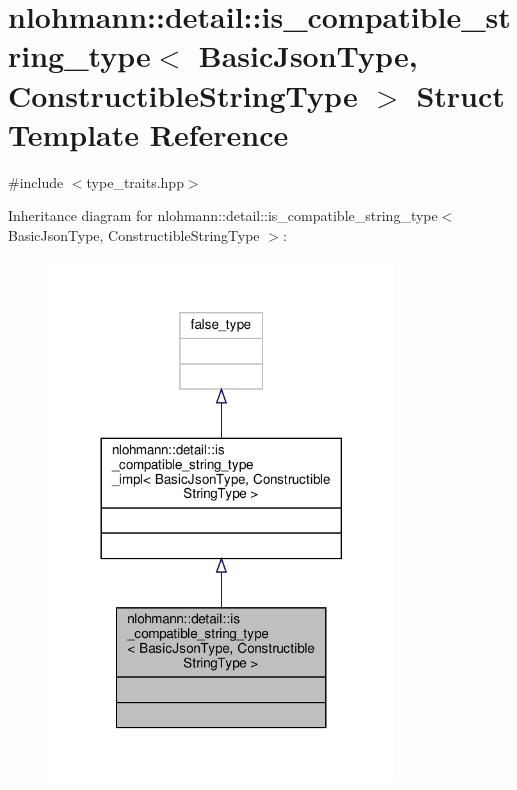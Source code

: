 \hypertarget{structnlohmann_1_1detail_1_1is__compatible__string__type}{}\section{nlohmann\+:\+:detail\+:\+:is\+\_\+compatible\+\_\+string\+\_\+type$<$ Basic\+Json\+Type, Constructible\+String\+Type $>$ Struct Template Reference}
\label{structnlohmann_1_1detail_1_1is__compatible__string__type}


{\ttfamily \#include $<$type\+\_\+traits.\+hpp$>$}



Inheritance diagram for nlohmann\+:\+:detail\+:\+:is\+\_\+compatible\+\_\+string\+\_\+type$<$ Basic\+Json\+Type, Constructible\+String\+Type $>$\+:
\nopagebreak
\begin{figure}[H]
\begin{center}
\leavevmode
\includegraphics[width=260pt]{structnlohmann_1_1detail_1_1is__compatible__string__type__inherit__graph}
\end{center}
\end{figure}


